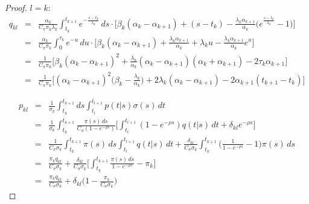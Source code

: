 \documentclass[pdftex,10pt]{article}
\begin{document}
\begin{proof}
$l=k$:
\begin{eqnarray*}
  q_{kl}&=&\frac{\alpha_k}{C_{\pi}\pi_k\lambda_k}\int_{t_k}^{t_{k+1}}e^{-\frac{s-t_k}{\lambda_k}}\,ds\cdot
  \Bigg[\beta_k(\alpha_k-\alpha_{k+1})+(s-t_k)-\frac{\lambda_k\alpha_{k+1}}{\alpha_k}
  \Big(e^{\frac{s-t_k}{\lambda_k}}-1\Big)\Bigg]\\
  &=&\frac{\alpha_k}{C_{\pi}\pi_k}\int_0^{\tau_k}e^{-u}\,du\cdot
  \Bigg[\beta_k(\alpha_k-\alpha_{k+1})+\frac{\lambda_k\alpha_{k+1}}{\alpha_k}
	+\lambda_ku-\frac{\lambda_k\alpha_{k+1}}{\alpha_k}e^u\Bigg]\\
  &=&\frac{1}{C_{\pi}\pi_k}\Bigg[\beta_k(\alpha_k-\alpha_{k+1})^2
  +\frac{\lambda_k}{\alpha_k}(\alpha_k-\alpha_{k+1})(\alpha_k+\alpha_{k+1})-2\tau_k\alpha_{k+1}\Bigg]\\
  &=&\frac{1}{C_{\pi}\pi_k}\Bigg[(\alpha_k-\alpha_{k+1})^2\Big(\beta_k-\frac{\lambda_k}{\alpha_k}\Big)
  +2\lambda_k(\alpha_k-\alpha_{k+1})-2\alpha_{k+1}(t_{k+1}-t_k)\Bigg]
\end{eqnarray*}

\begin{eqnarray*}
  p_{kl}&=&\frac{1}{\sigma_k}\int_{t_k}^{t_{k+1}}ds\int_{t_l}^{t_{l+1}}p(t|s)\sigma(s)\,dt\\
  &=&\frac{1}{\sigma_k}\int_{t_k}^{t_{k+1}}\frac{\pi(s)\,ds}{C_{\sigma}(1-e^{-\rho s})}
  \Bigg[\int_{t_l}^{t_{l+1}}(1-e^{-\rho s})q(t|s)\,dt+\delta_{kl}e^{-\rho s}\Bigg]\\
  &=&\frac{1}{C_{\sigma}\sigma_k}\int_{t_k}^{t_{k+1}}\pi(s)\,ds\int_{t_l}^{t_{l+1}}q(t|s)\,dt
  +\frac{\delta_{kl}}{C_{\sigma}\sigma_k}\int_{t_k}^{t_{k+1}}\Big(\frac{1}{1-e^{-\rho s}}-1\Big)\pi(s)\,ds\\
  &=&\frac{\pi_kq_{kl}}{C_{\sigma}\sigma_k}+\frac{\delta_{kl}}{C_{\sigma}\sigma_k}
  \Bigg[\int_{t_k}^{t_{k+1}}\frac{\pi(s)\,ds}{1-e^{-\rho s}}-\pi_k\Bigg]\\
  &=&\frac{\pi_k q_{kl}}{C_{\sigma}\sigma_k}+\delta_{kl}\Big(1-\frac{\pi_k}{C_{\sigma}\sigma_k}\Big)
\end{eqnarray*}

\end{proof}


\end{document}
